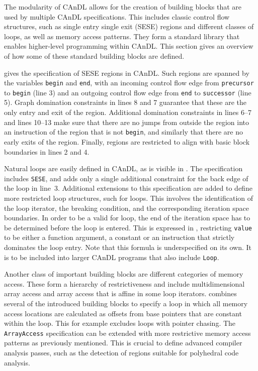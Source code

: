     The modularity of CAnDL allows for the creation of building blocks that are
    used by multiple CAnDL specifications.
    This includes classic control flow structures, such as single entry single
    exit (SESE) regions and different classes of loops, as well as memory access
    patterns.
    They form a standard library that enables higher-level programming
    within CAnDL.
    This section gives an overview of how some of these standard building
    blocks are defined.

     gives the specification of SESE regions in CAnDL.
    Such regions are spanned by the variables {\tt begin} and {\tt end}, with an
    incoming control flow edge from {\tt precursor} to {\tt begin} (line 3) and
    an outgoing control flow edge from {\tt end} to {\tt successor} (line 5).
    Graph domination constraints in lines 8 and 7 guarantee that these are the
    only entry and exit of the region.
    Additional domination constraints in lines 6--7 and lines 10--13 make sure
    that there are no jumps from outside the region into an instruction of the
    region that is not {\tt begin}, and similarly that there are no early exits
    of the region.
    Finally, regions are restricted to align with basic block boundaries in
    lines 2 and 4.

    Natural loops are easily defined in CAnDL, as is visible in
    .
    The specification includes {\tt SESE}, and adds only a single additional
    constraint for the back edge of the loop in line~3.
    Additional extensions to this specification are added to define more
    restricted loop structures, such for loops.
    This involves the identification of the loop iterator, the breaking
    condition, and the corresponding iteration space boundaries.
    In order to be a valid for loop, the end of the iteration space has to be
    determined before the loop is entered.
    This is expressed in , restricting {\tt value} to be
    either a function argument, a constant or an instruction that strictly
    dominates the loop entry.
    Note that this formula is underspecified on its own.
    It is to be included into larger CAnDL programs that also include
    {\tt Loop}.

    Another class of important building blocks are different categories of
    memory access.
    These form a hierarchy of restrictiveness and include multidimensional array
    access and array access that is affine in some loop iterators.
     combines several of the introduced building blocks to
    specify a loop in which all memory access locations are calculated as
    offsets from base pointers that are constant within the loop.
    This for example excludes loops with pointer chasing.
    The {\tt ArrayAccess} specification can be extended with more restrictive
    memory access patterns as previously mentioned.
    This is crucial to define advanced compiler analysis passes, such as the
    detection of regions suitable for polyhedral code analysis.

